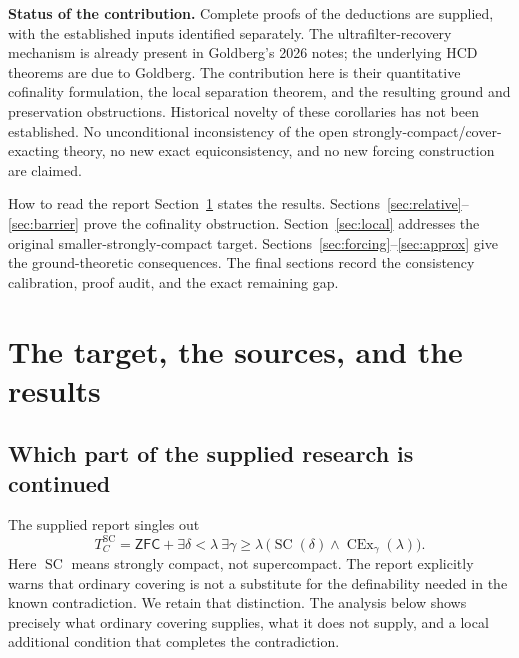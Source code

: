 \documentclass[11pt,letterpaper]{article}
\theoremstyle{definition}
\newcommand{\ZFC}{\mathsf{ZFC}}
\newcommand{\SC}{\operatorname{SC}}
\newcommand{\CEx}{\operatorname{CEx}}
\numberwithin{equation}{section}
\begin{document}
\textbf{Status of the contribution.} Complete proofs of the deductions are supplied, with the established inputs identified separately. The ultrafilter-recovery mechanism is already present in Goldberg's 2026 notes; the underlying HCD theorems are due to Goldberg. The contribution here is their quantitative cofinality formulation, the local separation theorem, and the resulting ground and preservation obstructions. Historical novelty of these corollaries has not been established. No unconditional inconsistency of the open strongly-compact/cover-exacting theory, no new exact equiconsistency, and no new forcing construction are claimed.

\newpage
\tableofcontents
\vspace{6pt}
\begin{assessment}{How to read the report}
Section~\ref{sec:main} states the results. Sections~\ref{sec:relative}--\ref{sec:barrier} prove the cofinality obstruction. Section~\ref{sec:local} addresses the original smaller-strongly-compact target. Sections~\ref{sec:forcing}--\ref{sec:approx} give the ground-theoretic consequences. The final sections record the consistency calibration, proof audit, and the exact remaining gap.
\end{assessment}

\newpage
\section{The target, the sources, and the results}\label{sec:main}

\subsection{Which part of the supplied research is continued}

The supplied report \cite[section ``Cover-exacting cardinals,'' and research agenda, Track~1]{baseline} singles out
\begin{equation}\label{eq:target}
 T_C^{\mathrm{SC}}=
 \ZFC+\exists\delta<\lambda\ \exists\gamma\geq\lambda\,
       \bigl(\SC(\delta)\wedge\CEx_\gamma(\lambda)\bigr).
\end{equation}
Here $\SC$ means strongly compact, not supercompact. The report explicitly warns that ordinary covering is not a substitute for the definability needed in the known contradiction. We retain that distinction. The analysis below shows precisely what ordinary covering supplies, what it does not supply, and a local additional condition that completes the contradiction.
\end{document}
